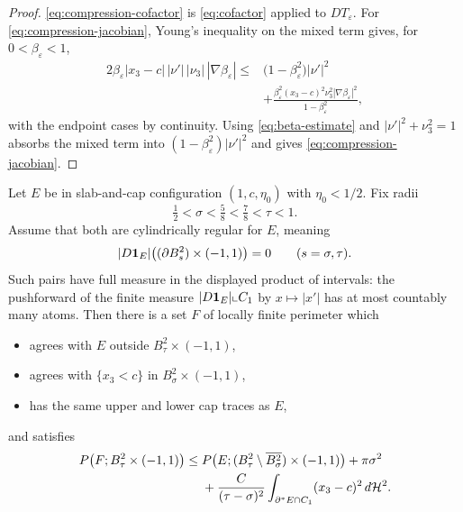 \begin{proof}
\eqref{eq:compression-cofactor} is \eqref{eq:cofactor} applied to
$DT_\varepsilon$.  For \eqref{eq:compression-jacobian}, Young's inequality on
the mixed term gives, for $0<\beta_\varepsilon<1$,
\[
\begin{aligned}
  2\beta_\varepsilon|x_3-c|\,|\nu'|\,|\nu_3|\,|\nabla\beta_\varepsilon|
  \le{}&\bigl(1-\beta_\varepsilon^2\bigr)|\nu'|^2\\
  &+\frac{\beta_\varepsilon^2(x_3-c)^2\nu_3^2|\nabla\beta_\varepsilon|^2}
        {1-\beta_\varepsilon^2} ,
\end{aligned}
\]
with the endpoint cases by continuity.  Using \eqref{eq:beta-estimate} and
$|\nu'|^2+\nu_3^2=1$ absorbs the mixed term into
$(1-\beta_\varepsilon^2)|\nu'|^2$ and gives
\eqref{eq:compression-jacobian}.
\end{proof}

\begin{theorem}\label{thm:deformation}
Let $E$ be in slab-and-cap configuration $(1,c,\eta_0)$ with
$\eta_0<1/2$.  Fix radii
\[
  \tfrac12<\sigma<\tfrac58<\tfrac78<\tau<1 .
\]
Assume that both are cylindrically regular for $E$, meaning
\begin{equation}\label{eq:cylindrical-regular-radii}
 |D\mathbf 1_{E}|\bigl((\partial B_s^2)\times(-1,1)\bigr)=0
 \qquad(s=\sigma,\tau).
\end{equation}
Such pairs have full measure in the displayed product of intervals: the
pushforward of the finite measure $|D\mathbf 1_{E}|\llcorner C_1$ by
$x\mapsto|x'|$ has at most countably many atoms.
Then there is a set $F$ of locally finite perimeter which
\begin{itemize}[nosep]
\item agrees with $E$ outside $B_\tau^2\times(-1,1)$,
\item agrees with $\{x_3<c\}$ in $B_\sigma^2\times(-1,1)$,
\item has the same upper and lower cap traces as $E$,
\end{itemize}
and satisfies
\begin{equation}\label{eq:deformation-estimate}
\begin{aligned}
  P\bigl(F;B_\tau^2\times(-1,1)\bigr)
  \le{}&P\bigl(E;(B_\tau^2\setminus\overline{B_\sigma^2})\times(-1,1)\bigr)
        +\pi\sigma^2\\
  &+\frac{C}{(\tau-\sigma)^2}
    \int_{\partial^* E\cap C_1}(x_3-c)^2\,d\mathcal H^2 .
\end{aligned}
\end{equation}
\end{theorem}

